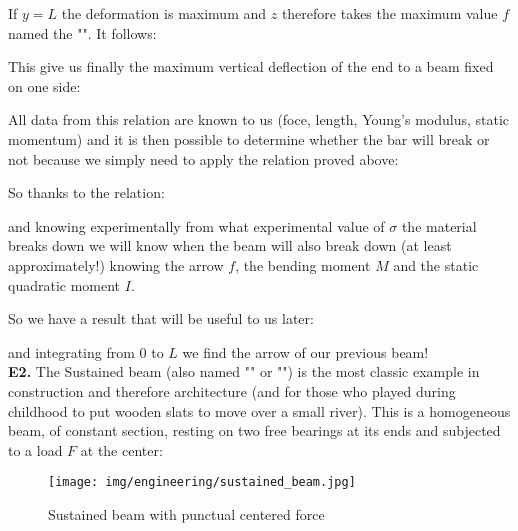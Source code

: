 	\begin{tcolorbox}[colframe=black,colback=white,sharp corners]
	If $y=L$ the deformation is maximum and $z$ therefore takes the maximum value $f$ named the "". It follows:
	
	This give us finally the maximum vertical deflection of the end to a beam fixed on one side:
	
	All data from this relation are known to us (foce, length, Young's modulus, static momentum) and it is then possible to determine whether the bar will break or not because we simply need to apply the relation proved above:
	
	So thanks to the relation:
	
	and knowing experimentally from what experimental value of $\sigma$ the material breaks down we will know when the beam will also break down (at least approximately!) knowing the arrow $f$, the bending moment $M$ and the static quadratic moment $I$.

	So we have a result that will be useful to us later:
	
	and integrating from $0$ to $L$ we find the arrow of our previous beam!\\

	\textbf{E2.} The Sustained beam (also named "" or "") is the most classic example in construction and therefore architecture (and for those who played during childhood to put wooden slats to move over a small river). This is a homogeneous beam, of constant section, resting on two free bearings at its ends and subjected to a load $F$ at the center:
	\begin{figure}[H]
		\centering
		\texttt{[image: img/engineering/sustained\_beam.jpg]}
		\caption{Sustained beam with punctual centered force}
	\end{figure}
	\end{tcolorbox}
	
